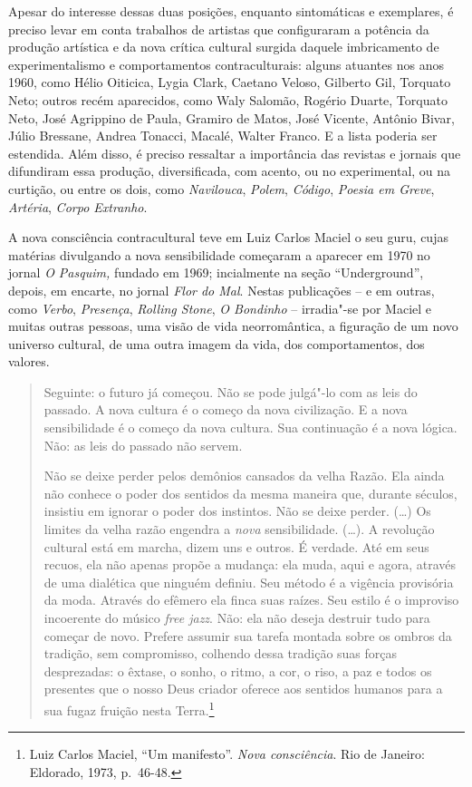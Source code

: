 Apesar do interesse dessas duas posições, enquanto sintomáticas e
exemplares, é preciso levar em conta trabalhos de artistas que
configuraram a potência da produção artística e da nova crítica cultural
surgida daquele imbricamento de experimentalismo e comportamentos
contraculturais: alguns atuantes nos anos 1960, como Hélio Oiticica,
Lygia Clark, Caetano Veloso, Gilberto Gil, Torquato Neto; outros recém %
aparecidos, como Waly Salomão, Rogério Duarte, Torquato Neto, José
Agrippino de Paula, Gramiro de Matos, José Vicente, Antônio Bivar, Júlio
Bressane, Andrea Tonacci, Macalé, Walter Franco. E a
lista poderia ser estendida. Além disso, é preciso ressaltar a
importância das revistas e jornais que difundiram essa produção,
diversificada, com acento, ou no experimental, ou na curtição, ou entre
os dois, como \emph{Navilouca}, \emph{Polem}, \emph{Código}, \emph{Poesia em Greve}, \emph{Artéria}, \emph{Corpo Extranho}.

\asterisc

A nova consciência contracultural teve em Luiz Carlos Maciel o seu guru,
cujas matérias divulgando a nova sensibilidade começaram a aparecer em
1970 no jornal \emph{O Pasquim,} fundado em 1969; incialmente na seção
``Underground'', depois, em encarte, no jornal \emph{Flor do Mal}.
Nestas publicações -- e em outras, como \emph{Verbo}, \emph{Presença}, \emph{Rolling
Stone}, \emph{O Bondinho} -- irradia"-se por Maciel e muitas outras pessoas, uma
visão de vida neorromântica, a figuração de um novo universo cultural,
de uma outra imagem da vida, dos comportamentos, dos valores.

\begin{quote}
Seguinte: o futuro já começou. Não se pode julgá"-lo com as leis do
passado. A nova cultura é o começo da nova civilização. E a nova
sensibilidade é o começo da nova cultura. Sua continuação é a nova
lógica. Não: as leis do passado não servem.

Não se deixe perder pelos demônios cansados da velha Razão. Ela ainda
não conhece o poder dos sentidos da mesma maneira que, durante séculos,
insistiu em ignorar o poder dos instintos. Não se deixe perder. (\ldots{}) Os
limites da velha razão engendra a \emph{nova} sensibilidade. (\ldots{}). A
revolução cultural está em marcha, dizem uns e outros. É verdade. Até em
seus recuos, ela não apenas propõe a mudança: ela muda, aqui e agora,
através de uma dialética que ninguém definiu. Seu método é a vigência
provisória da moda. Através do efêmero ela finca suas raízes. Seu estilo
é o improviso incoerente do músico \emph{free jazz}. Não: ela não deseja
destruir tudo para começar de novo. Prefere assumir sua tarefa montada
sobre os ombros da tradição, sem compromisso, colhendo dessa tradição
suas forças desprezadas: o êxtase, o sonho, o ritmo, a cor, o riso, a
paz e todos os presentes que o nosso Deus criador oferece aos sentidos
humanos para a sua fugaz fruição nesta Terra.\footnote{Luiz Carlos
  Maciel, ``Um manifesto''. \emph{Nova consciência}. Rio de Janeiro:
  Eldorado, 1973, p.~46-48.}
\end{quote}

